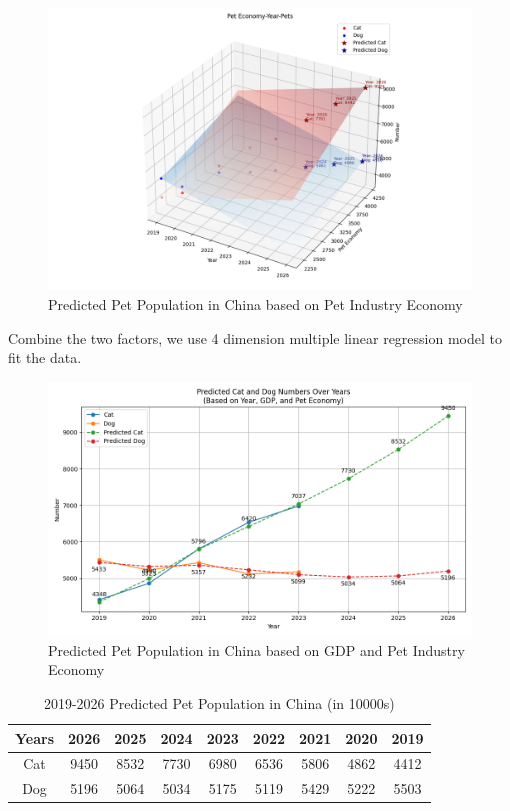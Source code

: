 \documentclass[withoutpreface,bwprint]{cumcmthesis} %
\begin{document}
\begin{figure}[htbp]
	\centering
	\includegraphics[width=.99\textwidth]{Figure_12}
	\caption{Predicted Pet Population in China based on Pet Industry Economy}
\end{figure}
\clearpage
\par Combine the two factors, we use 4 dimension multiple linear regression model to fit the data.
\begin{figure}[htbp]
	\centering
	\includegraphics[width=.99\textwidth]{Figure_13}
	\caption{Predicted Pet Population in China based on GDP and Pet Industry Economy}
\end{figure}
\begin{table}[!htbp]
    \caption{2019-2026 Predicted Pet Population in China (in 10000s)} \centering
    \begin{tabular}{ccccccccc}
    \toprule[1.5pt]
    Years & 2026 & 2025 & 2024 & 2023 & 2022 & 2021 & 2020 & 2019 \\
    \midrule[1pt]
    Cat & 9450 & 8532 & 7730 & 6980 & 6536 & 5806 & 4862 & 4412 \\
    Dog & 5196 & 5064 & 5034 & 5175 & 5119 & 5429 & 5222 & 5503 \\
    \bottomrule[1.5pt]
    \end{tabular}
\end{table}
\end{document}
